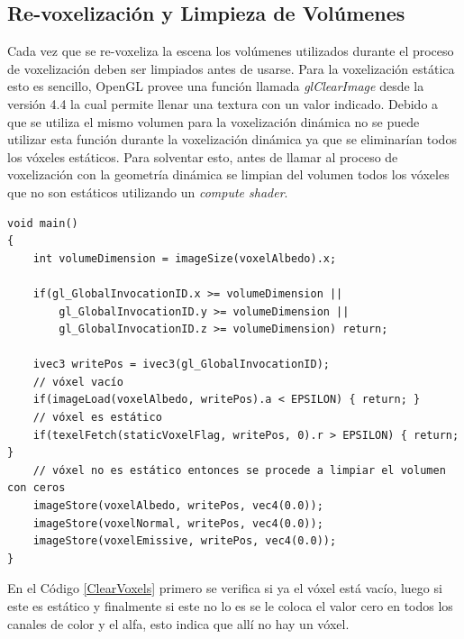 \subsection{Re-voxelización y Limpieza de Volúmenes}
Cada vez que se re-voxeliza la escena los volúmenes utilizados durante el proceso de voxelización deben ser limpiados antes de usarse. Para la voxelización estática esto es sencillo, OpenGL provee una función llamada \emph{glClearImage} desde la versión 4.4 la cual permite llenar una textura con un valor indicado. Debido a que se utiliza el mismo volumen para la voxelización dinámica no se puede utilizar esta función durante la voxelización dinámica ya que se eliminarían todos los vóxeles estáticos. Para solventar esto, antes de llamar al proceso de voxelización con la geometría dinámica se limpian del volumen todos los vóxeles que no son estáticos utilizando un \emph{compute shader}.
\\
\begin{lstlisting}[caption={Limpieza de vóxeles no estáticos.}, label=ClearVoxels]
void main()
{
    int volumeDimension = imageSize(voxelAlbedo).x;

    if(gl_GlobalInvocationID.x >= volumeDimension ||
        gl_GlobalInvocationID.y >= volumeDimension ||
        gl_GlobalInvocationID.z >= volumeDimension) return;

    ivec3 writePos = ivec3(gl_GlobalInvocationID);
    // vóxel vacío
    if(imageLoad(voxelAlbedo, writePos).a < EPSILON) { return; }
    // vóxel es estático
    if(texelFetch(staticVoxelFlag, writePos, 0).r > EPSILON) { return; }
    // vóxel no es estático entonces se procede a limpiar el volumen con ceros
    imageStore(voxelAlbedo, writePos, vec4(0.0));
    imageStore(voxelNormal, writePos, vec4(0.0));
    imageStore(voxelEmissive, writePos, vec4(0.0));
}
\end{lstlisting}

En el Código \ref{ClearVoxels} primero se verifica si ya el vóxel está vacío, luego si este es estático y finalmente si este no lo es se le coloca el valor cero en todos los canales de color y el alfa, esto indica que allí no hay un vóxel.
